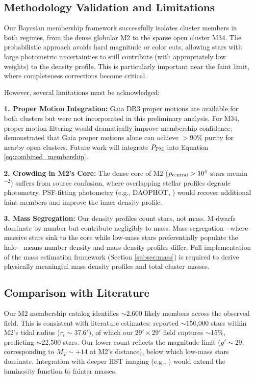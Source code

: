 \documentclass[linenumbers,trackchanges,twocolumn]{aastex701}
\begin{document}
\subsection{Methodology Validation and Limitations}

Our Bayesian membership framework successfully isolates cluster members in both regimes, from the dense globular M2 to the sparse open cluster M34. The probabilistic approach avoids hard magnitude or color cuts, allowing stars with large photometric uncertainties to still contribute (with appropriately low weights) to the density profile. This is particularly important near the faint limit, where completeness corrections become critical.

However, several limitations must be acknowledged:

\textbf{1. Proper Motion Integration:} Gaia DR3 proper motions are available for both clusters but were not incorporated in this preliminary analysis. For M34, proper motion filtering would dramatically improve membership confidence; \citet{2018A&A...618A..93C} demonstrated that Gaia proper motions alone can achieve $>90\%$ purity for nearby open clusters. Future work will integrate $P_{\rm PM}$ into Equation \ref{eq:combined_membership}.

\textbf{2. Crowding in M2's Core:} The dense core of M2 ($\rho_{\rm central} > 10^4$ stars arcmin$^{-2}$) suffers from source confusion, where overlapping stellar profiles degrade photometry. PSF-fitting photometry (e.g., DAOPHOT, \citealt{stetson1987}) would recover additional faint members and improve the inner density profile.

\textbf{3. Mass Segregation:} Our density profiles count stars, not mass. M-dwarfs dominate by number but contribute negligibly to mass. Mass segregation—where massive stars sink to the core while low-mass stars preferentially populate the halo—means number density and mass density profiles differ. Full implementation of the mass estimation framework (Section \ref{subsec:mass}) is required to derive physically meaningful mass density profiles and total cluster masses.

\subsection{Comparison with Literature}

Our M2 membership catalog identifies $\sim$2,600 likely members across the observed field. This is consistent with literature estimates: \citet{1996AJ....112.1487H} reported $\sim$150,000 stars within M2's tidal radius ($r_t \sim 37.6'$), of which our $29' \times 29'$ field captures $\sim$15\%, predicting $\sim$22,500 stars. Our lower count reflects the magnitude limit ($g' \sim 29$, corresponding to $M_V \sim +14$ at M2's distance), below which low-mass stars dominate. Integration with deeper HST imaging (e.g., \citealt{2007AJ....133.1658P}) would extend the luminosity function to fainter masses.
\end{document}
